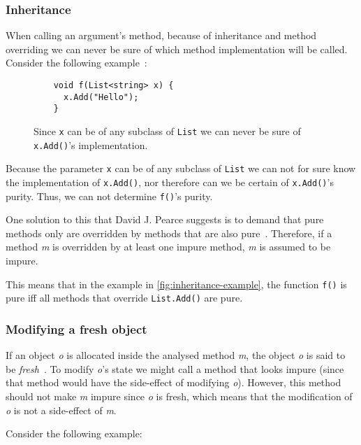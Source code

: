 \documentclass[a4paper,12pt]{article}
\begin{document}
\subsubsection{Inheritance} \label{sub:inheritance}

When calling an argument's method, because of inheritance and method overriding we can never be sure of which method implementation will be called. Consider the following example~\cite{pearce2011jpure}:

\begin{figure}[H]
  \centering
  \begin{lstlisting}
    void f(List<string> x) {
      x.Add("Hello");
    }
  \end{lstlisting}
  \caption{Since \texttt{x} can be of any subclass of \texttt{List} we can never be sure of \texttt{x.Add()}'s implementation.}
  \label{fig:inheritance-example}
\end{figure}

Because the parameter \texttt{x} can be of any subclass of \texttt{List} we can not for sure know the implementation of \texttt{x.Add()}, nor therefore can we be certain of \texttt{x.Add()}'s purity. Thus, we can not determine \texttt{f()}'s purity.

One solution to this that David J. Pearce suggests is to demand that pure methods only are overridden by methods that are also pure~\cite{pearce2011jpure}. Therefore, if a method \textit{m} is overridden by at least one impure method, \textit{m} is assumed to be impure.

This means that in the example in \autoref{fig:inheritance-example}, the function \texttt{f()} is pure iff all methods that override \texttt{List.Add()} are pure.

\subsubsection{Modifying a fresh object} \label{sub:modifying-fresh-objects}

If an object \textit{o} is allocated inside the analysed method \textit{m}, the object \textit{o} is said to be \textit{fresh}~\cite{pearce2011jpure}. To modify \textit{o}'s state we might call a method that looks impure (since that method would have the side-effect of modifying \textit{o}). However, this method should not make \textit{m} impure since \textit{o} is fresh, which means that the modification of \textit{o} is not a side-effect of \textit{m}.

Consider the following example:
\end{document}
